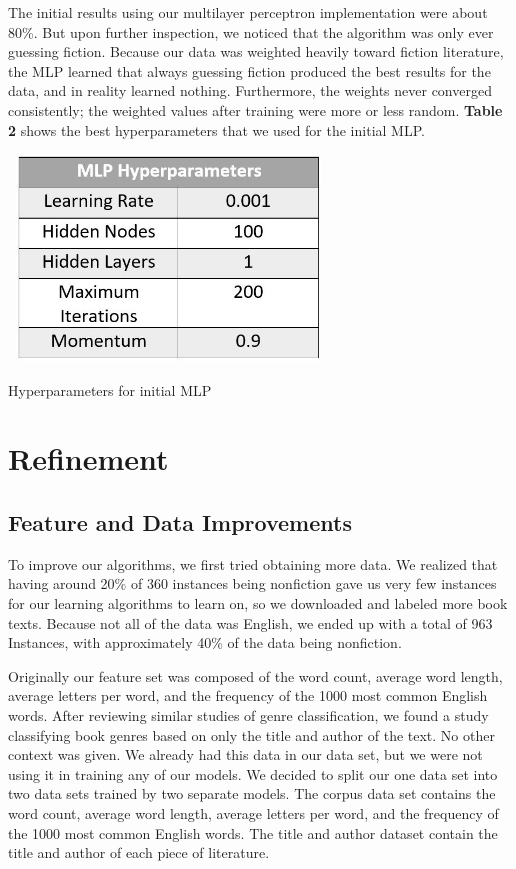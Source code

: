 \documentclass{article}
\begin{document}
The initial results using our multilayer perceptron implementation were about 80\%. But upon further inspection, we noticed that the algorithm was only ever guessing fiction. Because our data was weighted heavily toward fiction literature,  the MLP learned that always guessing fiction produced the best results for the data, and in reality learned nothing. Furthermore, the weights never converged consistently; the weighted values after training were more or less random. \textbf{Table 2} shows the best hyperparameters that we used for the initial MLP.

\begin{table}[b]
  \includegraphics[width=8.5cm,height=5.5cm]{Table2.JPG}
  \caption{Hyperparameters for initial MLP}
\end{table}

\section{Refinement}

\subsection{Feature and Data Improvements}

To improve our algorithms, we first tried obtaining more data. We realized that having around 20\% of 360 instances being nonfiction gave us very few instances for our learning algorithms to learn on, so we downloaded and labeled more book texts. Because not all of the data was English, we ended up with a total of 963 Instances, with approximately 40\% of the data being nonfiction. \par
Originally our feature set was composed of the word count, average word length, average letters per word, and the frequency of the 1000 most common English words. After reviewing similar studies of genre classification, we found a study classifying book genres based on only the title and author of the text. No other context was given. We already had this data in our data set, but we were not using it in training any of our models. We decided to split our one data set into two data sets trained by two separate models. The corpus data set contains the word count, average word length, average letters per word, and the frequency of the 1000 most common English words. The title and author dataset contain the title and author of each piece of literature.
\end{document}

